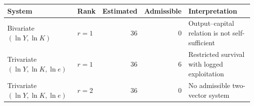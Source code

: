 \begin{tabular}{llrrp{4.5cm}}
\toprule
System & Rank & Estimated & Admissible & Interpretation \\
\midrule
Bivariate $(\ln Y,\ln K)$ & $r=1$ & 36 & 0 & Output--capital relation is not self-sufficient \\
Trivariate $(\ln Y,\ln K,\ln e)$ & $r=1$ & 36 & 6 & Restricted survival with logged exploitation \\
Trivariate $(\ln Y,\ln K,\ln e)$ & $r=2$ & 36 & 0 & No admissible two-vector system \\
\bottomrule
\end{tabular}
